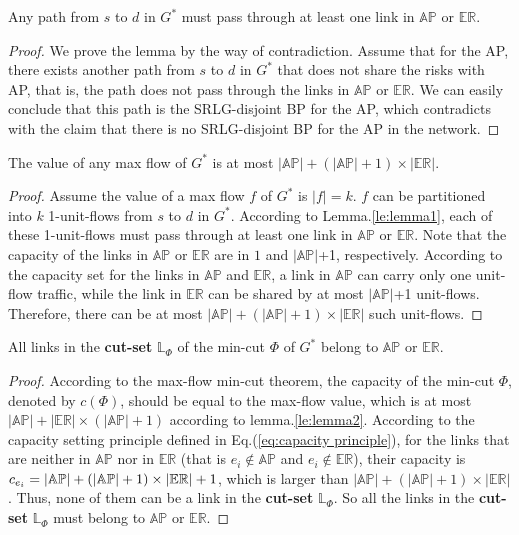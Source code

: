 \begin{lemma}
\label{le:lemma1}
    Any path from $s$ to $d$ in $G^*$ must pass through at least one link in $\mathbb{AP}$ or $\mathbb{\mathbb{ER}}$.
\end{lemma}
\begin{proof}
We prove the lemma by the way of contradiction. Assume that for the AP, there exists another path from  $s$ to $d$ in $G^*$ that does not share the risks with  AP, that is, the path does not pass through the links in $\mathbb{AP}$ or $\mathbb{\mathbb{ER}}$. We can easily conclude that this path is the SRLG-disjoint BP for the AP, which contradicts with the claim that there is no SRLG-disjoint BP for the AP in the network.
\end{proof}
\begin{lemma}
\label{le:lemma2}
    The value of any max flow of $G^*$ is at most $|\mathbb{AP}|+(|\mathbb{AP}|+1)\times|\mathbb{\mathbb{ER}}|$.
\end{lemma}
\begin{proof}
Assume the value of a max flow $f$ of $G^*$ is $|f|=k$. $f$ can be  partitioned into $k$ 1-unit-flows from $s$ to $d$ in  $G^*$.
According to Lemma.\ref{le:lemma1}, each of these 1-unit-flows must pass through at least one link in $\mathbb{AP}$ or $\mathbb{\mathbb{ER}}$.
 Note that the capacity of the links in  $\mathbb{AP}$ or $\mathbb{\mathbb{ER}}$ are in $1$ and $|\mathbb{AP}|$+1, respectively. According to the capacity set for the links in $\mathbb{AP}$ and $\mathbb{\mathbb{ER}}$, a link in $\mathbb{AP}$ can carry only one unit-flow traffic, while the  link in $\mathbb{ER}$ can be shared by at most  $|\mathbb{AP}|$+1 unit-flows.
 Therefore, there can be at most $|\mathbb{AP}|+ (|\mathbb{AP}|+1)\times|\mathbb{\mathbb{ER}}|$ such unit-flows.
\end{proof}
\begin{lemma}
\label{le:lemma3}
    All  links in the \textbf{cut-set} $\mathbb{L}_{\Phi}$ of the min-cut $\Phi$ of $G^*$ belong to $\mathbb{AP}$ or $\mathbb{\mathbb{ER}}$.
\end{lemma}
\begin{proof}
    According to the max-flow min-cut theorem, the capacity of the min-cut $\Phi$, denoted by $c(\Phi)$, should be equal to the max-flow value, which is at most $|\mathbb{AP}|+ |\mathbb{ER}|\times (|\mathbb{AP}|+1)$ according to lemma.\ref{le:lemma2}. According to the capacity setting principle defined in Eq.(\ref{eq:capacity principle}), for the links that are neither in $\mathbb{AP}$ nor in $\mathbb{ER}$ (that is $e_i \notin \mathbb{AP}$ and $e_i \notin \mathbb{ER}$), their capacity is $c_{e_i} = \left| {{\rm\mathbb{AP}}} \right| + \left( {\left| {{\rm\mathbb{AP}}} \right| + 1} \right)\times \left| {{\rm{\mathbb{E}}}{{\rm{\mathbb{R}}}}} \right| + 1$, which is larger than $|\mathbb{AP}|+(|\mathbb{AP}|+1)\times |\mathbb{ER}|$. Thus, none of them can be a link in the \textbf{cut-set} $\mathbb{L}_{\Phi}$. So all the  links in the \textbf{cut-set} $\mathbb{L}_{\Phi}$ must belong to $\mathbb{AP}$ or $\mathbb{ER}$.
\end{proof}
